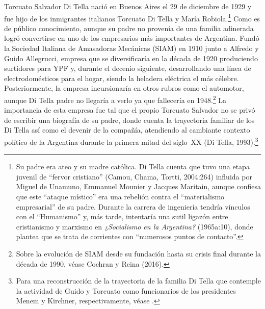 Torcuato Salvador Di Tella nació en Buenos Aires el 29 de diciembre de 1929 y fue hijo de los inmigrantes italianos Torcuato Di Tella y María Robiola.\footnote{Su padre era ateo y su madre católica. Di Tella cuenta que tuvo una etapa juvenil de \enquote{fervor cristiano} (Camou, Chama, Tortti, 2004:264) influida por Miguel de Unamuno, Emmanuel Mounier y Jacques Maritain, aunque confiesa que este \enquote{ataque místico} era una rebelión contra el \enquote{materialismo empresarial} de su padre. Durante la carrera de ingeniería tendría vínculos con el \enquote{Humanismo} y, más tarde, intentaría una sutil ligazón entre cristianismo y marxismo en \emph{¿Socialismo en la Argentina?} (1965a:10), donde plantea que se trata de corrientes con \enquote{numerosos puntos de contacto}.} Como es de público conocimiento, aunque su padre no provenía de una familia adinerada logró convertirse en uno de los empresarios más importantes de Argentina. Fundó la Sociedad Italiana de Amasadoras Mecánicas (SIAM) en 1910 junto a Alfredo y Guido Allegrucci, empresa que se diversificaría en la década de 1920 produciendo surtidores para YPF y, durante el decenio siguiente, desarrollando una línea de electrodomésticos para el hogar, siendo la heladera eléctrica el más célebre. Posteriormente, la empresa incursionaría en otros rubros como el automotor, aunque Di Tella padre no llegaría a verlo ya que fallecería en 1948.\footnote{Sobre la evolución de SIAM desde su fundación hasta su crisis final durante la década de 1990, véase Cochran y Reina (2016).} La importancia de esta empresa fue tal que el propio Torcuato Salvador no se privó de escribir una biografía de su padre, donde cuenta la trayectoria familiar de los Di Tella así como el devenir de la compañía, atendiendo al cambiante contexto político de la Argentina durante la primera mitad del siglo~XX (Di Tella, 1993).\footnote{Para una reconstrucción de la trayectoria de la familia Di Tella que contemple la actividad de Guido y Torcuato como funcionarios de los presidentes Menem y Kirchner, respectivamente, véase \textcite{1448-CASSESE2008}.}

